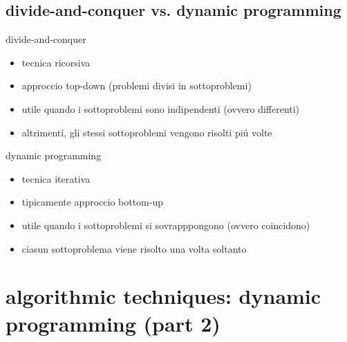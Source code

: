 
\subsection*{divide-and-conquer vs. dynamic programming}
\begin{flushleft}
		\item divide-and-conquer
		\begin{itemize}
			\item tecnica ricorsiva
			\item approccio top-down (problemi divisi in sottoproblemi)
			\item utile quando i sottoproblemi sono indipendenti (ovvero differenti)
			\item altrimenti, gli stessi sottoproblemi vengono risolti pi\'u volte
		\end{itemize}
		\item dynamic programming
		\begin{itemize}
			\item tecnica iterativa
			\item tipicamente approccio bottom-up
			\item utile quando i sottoproblemi si sovrapppongono (ovvero coincidono)
			\item ciasun sottoproblema viene risolto una volta soltanto
		\end{itemize}
\end{flushleft}


\section*{algorithmic techniques: dynamic programming (part 2)}


